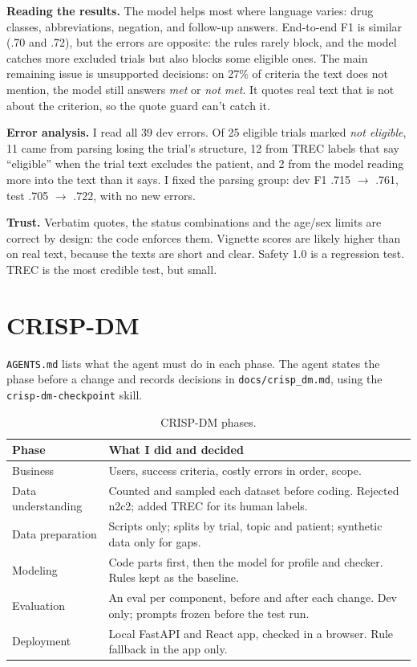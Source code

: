 \documentclass[11pt,a4paper]{article}
\begin{document}
\textbf{Reading the results.} The model helps most where language varies: drug classes, abbreviations, negation, and follow-up answers. End-to-end F1 is similar (.70 and .72), but the errors are opposite: the rules rarely block, and the model catches more excluded trials but also blocks some eligible ones. The main remaining issue is unsupported decisions: on 27\% of criteria the text does not mention, the model still answers \emph{met} or \emph{not met}. It quotes real text that is not about the criterion, so the quote guard can't catch it.

\textbf{Error analysis.} I read all 39 dev errors. Of 25 eligible trials marked \emph{not eligible}, 11 came from parsing losing the trial's structure, 12 from TREC labels that say ``eligible'' when the trial text excludes the patient, and 2 from the model reading more into the text than it says. I fixed the parsing group: dev F1 .715 $\to$ .761, test .705 $\to$ .722, with no new errors.

\textbf{Trust.} Verbatim quotes, the status combinations and the age/sex limits are correct by design: the code enforces them. Vignette scores are likely higher than on real text, because the texts are short and clear. Safety 1.0 is a regression test. TREC is the most credible test, but small.

\section{CRISP-DM}

\texttt{AGENTS.md} lists what the agent must do in each phase. The agent states the phase before a change and records decisions in \texttt{docs/crisp\_dm.md}, using the \texttt{crisp-dm-checkpoint} skill.

\begin{table}[!htb]
\centering
\small
\begin{tabular}{>{\raggedright\arraybackslash}p{2.6cm}>{\raggedright\arraybackslash}p{11.6cm}}
\toprule
Phase & What I did and decided \\
\midrule
Business & Users, success criteria, costly errors in order, scope. \\
Data understanding & Counted and sampled each dataset before coding. Rejected n2c2; added TREC for its human labels. \\
Data preparation & Scripts only; splits by trial, topic and patient; synthetic data only for gaps. \\
Modeling & Code parts first, then the model for profile and checker. Rules kept as the baseline. \\
Evaluation & An eval per component, before and after each change. Dev only; prompts frozen before the test run. \\
Deployment & Local FastAPI and React app, checked in a browser. Rule fallback in the app only. \\
\bottomrule
\end{tabular}
\caption{CRISP-DM phases.}
\end{table}
\end{document}
